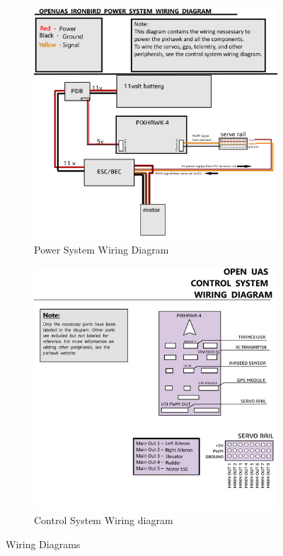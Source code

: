 \documentclass{article}
\begin{document}
\begin{figure}[!h]
\begin{subfigure}{0.5\textwidth}
\includegraphics[width=0.8\linewidth]{Images/wiring powersyste v6.png}
\caption{Power System Wiring Diagram}
\label{fig:pwrsystm}
\end{subfigure}
\begin{subfigure}{0.5\textwidth}
\includegraphics[width=0.75\linewidth]{Images/PIXHAWK4 control system wiring.png}
\caption{Control System Wiring diagram}
\label{fig:ctrlsystm}
\end{subfigure}
\caption{Wiring Diagrams}
\label{fig:wiringidagrsm}
\end{figure}
 \newpage
\end{document}
